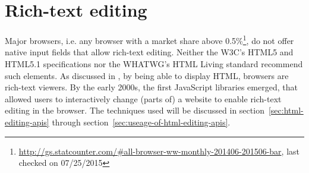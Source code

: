 \section{Rich-text editing}

Major browsers, i.e. any browser with a market share above 0.5\%\footnote{\url{http://gs.statcounter.com/\#all-browser-ww-monthly-201406-201506-bar}, last checked on 07/25/2015}, do not offer native input fields that allow rich-text editing. Neither the W3C's HTML5 and HTML5.1 specifications nor the WHATWG's HTML Living standard recommend such elements. As discussed in , by being able to display HTML, browsers are rich-text viewers. By the early 2000s, the first JavaScript libraries emerged, that allowed users to interactively change (parts of) a website to enable rich-text editing in the browser. The techniques used will be discussed in section~\ref{sec:html-editing-apis} through section~\ref{sec:useage-of-html-editing-apis}.

